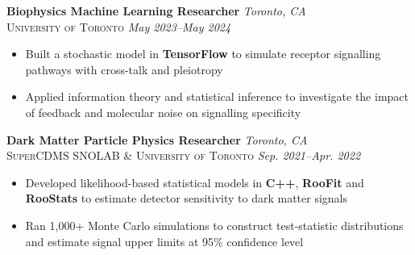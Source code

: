 \documentclass[10pt, letterpaper]{article}
\newenvironment{highlightsforbulletentries}{
    \begin{itemize}[
        topsep=0.05 cm,
        parsep=0.01 cm,
        partopsep=0pt,
        itemsep=0pt,
        leftmargin=10pt
    ]
}{
    \end{itemize}
} %
\newenvironment{onecolentry}{
    \begin{adjustwidth}{
    }{
    }
}{
    \end{adjustwidth}
} %
\newcommand{\lightfont}[1]{{\fontseries{l}\selectfont #1}}
\begin{document}
        \begin{onecolentry}
            \textbf{Biophysics Machine Learning Researcher} \hfill
        \textit{Toronto, CA} \\
        \textsc{University of Toronto} \hfill
        \textit{\lightfont{May 2023--May 2024}}
            \begin{highlightsforbulletentries}
                \item Built a stochastic model in \textbf{TensorFlow} to simulate receptor signalling pathways with cross-talk and pleiotropy
                \item Applied information theory and statistical inference to investigate the impact of feedback and molecular noise on signalling specificity
            \end{highlightsforbulletentries}
        \end{onecolentry}
\vspace{0.2 cm}
\begin{onecolentry}
            \textbf{Dark Matter Particle Physics Researcher} \hfill
        \textit{Toronto, CA} \\
        \textsc{SuperCDMS SNOLAB \& University of Toronto} \hfill \textit{\lightfont{Sep. 2021--Apr. 2022}}
        \begin{highlightsforbulletentries}
                \item Developed likelihood-based statistical models in
    \textbf{C++}, \textbf{RooFit} and \textbf{RooStats}
    to estimate detector sensitivity to dark matter signals
                \item Ran 1,000+ Monte Carlo simulations to construct
    test-statistic distributions and estimate signal upper
    limits at 95\% confidence level
        \end{highlightsforbulletentries}
\end{onecolentry}
\end{document}
